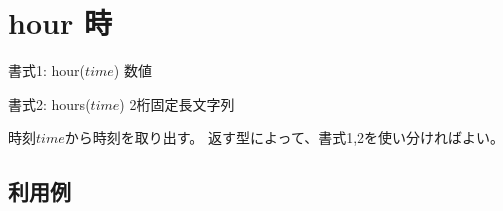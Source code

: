 
%

\section{hour 時\label{sect:hour}}

書式1: hour($time$) 数値

書式2: hours($time$) 2桁固定長文字列

時刻$time$から時刻を取り出す。
返す型によって、書式1,2を使い分ければよい。

\subsection*{利用例}


%


